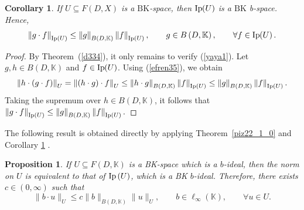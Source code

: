 \documentclass[14pt, a4paper]{article}  %
\providecommand{\pare}[1]{\left( #1\right) }
\providecommand{\norm}[1]{\left\lVert#1\right\rVert}
\newcommand{\K}{\mathbb{K}}
\newcommand{\BK}{\text{BK}}
\newtheorem{corollary}{Corollary}[section]
\newtheorem{proposition}{Proposition}[section]
\begin{document}
	\begin{corollary}\label{yaya2}	If $U \subseteq F\pare{D,X}$ is a $\BK$-space, then  $\text{Ip}\hspace{-2pt}\pare{U}$ is a   $\BK $ b-space. Hence, \begin{equation}\label{yaya1}  \norm{g\cdot f}_{\text{Ip}\hspace{-0pt}\pare{U}}\leq \norm{g}_{B\pare{D,\K}}\norm{f}_{\text{Ip}\hspace{-0pt}\pare{U}},\qquad g\in B\pare{D,\K}, \qquad \forall f\in \textnormal{Ip}\hspace{-2pt}\pare{U}. \end{equation}  
\end{corollary}
\begin{proof}
By Theorem~(\ref{d334}), it only remains to verify (\ref{yaya1}). Let $g,h\in B\pare{D,\K}$ and $f\in \textnormal{Ip}\hspace{-2pt}\pare{U}$. Using (\ref{efren35}), we obtain
\begin{equation}
	\norm{h\cdot (g\cdot f)}_{U}
	=
	\norm{(h\cdot g)\cdot f}_{U}
	\leq
	\norm{h\cdot g}_{B\pare{D,\K}}\norm{f}_{\text{Ip}\hspace{-0pt}\pare{U}}
	\leq
	\norm{ g}_{B\pare{D,\K}}\norm{f}_{\text{Ip}\hspace{-0pt}\pare{U}}.
\end{equation}
Taking the supremum over $h\in B\pare{D,\K}$, it follows that
$
\norm{g\cdot f}_{\text{Ip}\hspace{-0pt}\pare{U}}
\leq
\norm{g}_{B\pare{D,\K}}\norm{f}_{\text{Ip}\hspace{-0pt}\pare{U}}.
$
\end{proof}

The following result is obtained directly by applying Theorem~\ref{piz22_1_0} and Corollary \ref{yaya2} .

\begin{proposition}\label{final8} 
If $U \subseteq F\pare{D, \K}$ is a BK-space which is a $b$-ideal, then the norm on $U$ is equivalent to that of $\text{Ip}\hspace{-0pt}\pare{U}$, which is a BK $b$-ideal. Therefore, there exists $c\in(0,\infty)$ such that
	\begin{equation}\label{yaya3}
		\| b \cdot u \|_U \leq c \|b\|_{B(D,\K)} \|u\|_U,
		\qquad
		b\in \ell_{\infty}\pare{\K},
		\qquad
		\forall u\in U.
	\end{equation}
\end{proposition}
\end{document}
